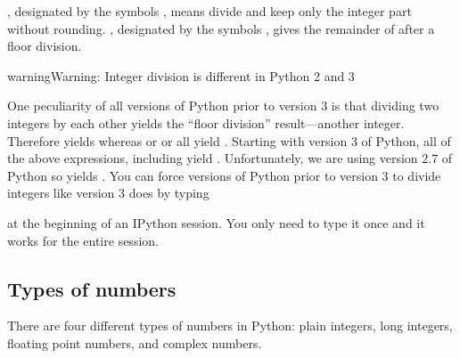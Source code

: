 \documentclass[letterpaper,10pt,english]{sphinxmanual}
\begin{document}
\sphinxAtStartPar
{}, designated by the symbols \sphinxcode{\sphinxupquote{//}}, means divide and keep only the integer part without rounding.  , designated by the symbols \sphinxcode{\sphinxupquote{\%}}, gives the remainder of after a floor division.

\begin{sphinxadmonition}{warning}{Warning:}
\sphinxAtStartPar
Integer division is different in Python 2 and 3
\end{sphinxadmonition}

\ignorespaces 
\sphinxAtStartPar
One peculiarity of all versions of Python prior to version 3 is that dividing two integers by each other yields the “floor division” result—another integer.  Therefore  yields  whereas  or  or  all yield .  Starting with version 3 of Python, all of the above expressions, including  yield .  Unfortunately, we are using version 2.7 of Python so  yields .  You can force versions of Python prior to version 3 to divide integers like version 3 does by typing

\begin{sphinxVerbatim}[commandchars=\\\{\}]
\end{sphinxVerbatim}

\sphinxAtStartPar
at the beginning of an IPython session.  You only need to type it once and it works for the entire session.


\subsection{Types of numbers}
\label{\detokenize{chap2/chap2_basics:types-of-numbers}}
\sphinxAtStartPar
There are four different types of numbers in Python: plain integers, long integers, floating point numbers, and complex numbers.
\end{document}
